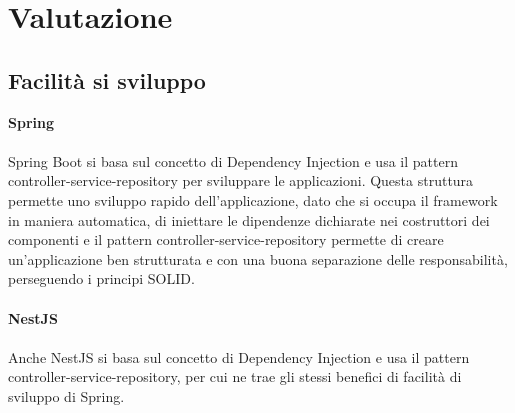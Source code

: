 \section{Valutazione}
\subsection{Facilità si sviluppo}
\textbf{Spring}
\\\\
Spring Boot si basa sul concetto di Dependency Injection e usa il pattern controller-service-repository
per sviluppare le applicazioni. Questa struttura permette uno sviluppo rapido dell'applicazione, dato
che si occupa il framework in maniera automatica, di iniettare le dipendenze dichiarate nei costruttori dei componenti e 
il pattern controller-service-repository permette di creare un'applicazione ben strutturata e con una 
buona separazione delle responsabilità, perseguendo i principi SOLID.
\\\\
\textbf{NestJS}
\\\\
Anche NestJS si basa sul concetto di Dependency Injection e usa il pattern controller-service-repository, per
cui ne trae gli stessi benefici di facilità di sviluppo di Spring.

